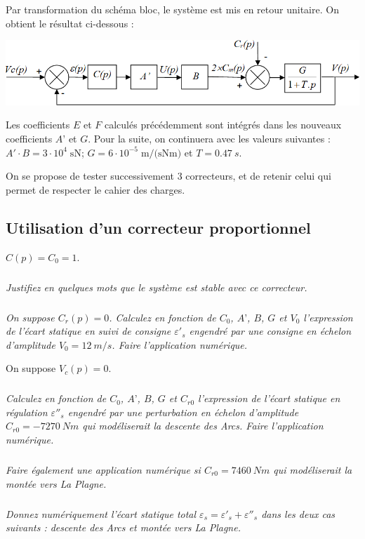 \documentclass[10pt,fleqn]{article} %
\begin{document}
Par transformation du schéma bloc, le système est mis en retour unitaire. On obtient le résultat ci-dessous :
\begin{center}
	\includegraphics[width=\linewidth]{images2/fig_05}
\end{center}

	Les coefficients $E$ et $F$ calculés précédemment sont intégrés dans les nouveaux coefficients $A’$ et $G$. Pour la suite, on continuera avec les valeurs suivantes : $A'\cdot B=3\cdot 10^{4}\;\text{sN}$; $G=6\cdot 10^{-5}\;\text{m/(sNm)}$ et $T=\SI{0,47}{s}$.
	
	
On se propose de tester successivement 3 correcteurs, et de retenir celui qui permet de respecter le cahier des charges.

\subsection{Utilisation d'un correcteur proportionnel}
$C(p)=C_0=1$.


\subparagraph{}
\textit{Justifiez en quelques mots que le système est stable avec ce correcteur.}

\subparagraph{}
\textit{On suppose $C_r(p)=0$. Calculez en fonction de $C_0$, $A’$, $B$, $G$ et $V_0$ l’expression de l’écart statique en suivi de consigne $\varepsilon'_s$ engendré par une consigne en échelon d’amplitude $V_0=\SI{12}{m/s}$. Faire l’application numérique.}

\vspace{.5cm}

On suppose $V_c(p)=0$.
\subparagraph{}
\textit{Calculez en fonction de $C_0$, $A’$, $B$, $G$ et $C_{r0}$ l’expression de l’écart statique en régulation $\varepsilon''_s$ engendré par une perturbation en échelon d’amplitude $C_{r0}=\SI{-7270}{Nm}$ qui modéliserait la descente des Arcs. Faire l’application numérique.}

\subparagraph{}
\textit{Faire également une application numérique si $C_{r0}=\SI{7460}{Nm}$ qui modéliserait la montée vers La Plagne.}

\subparagraph{}
\textit{Donnez numériquement l’écart statique total $\varepsilon_s=\varepsilon'_s+ \varepsilon''_s$  dans les deux cas suivants : descente des Arcs et montée vers La Plagne.}
\end{document}
